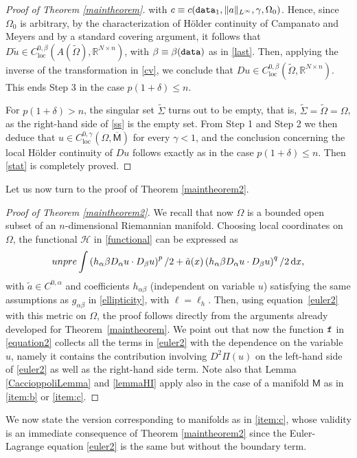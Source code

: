\documentclass[a4paper]{amsart}
\def\loc{\operatorname{loc}}
\theoremstyle{plain}  %
\numberwithin{equation}{section}
\newcommand{\R}{\mathbb{R}}
\newcommand{\dd}{\mathrm{d}}
\newcommand{\mm}{\mathsf{M}}
\newcommand{\nr}[1]{\lVert #1 \rVert}
\newcommand{\tx}[1]{\textnormal{\texttt{#1}}}
\def\loc{\operatorname{loc}}
\def\eqn#1$$#2$${\begin{equation}\label#1#2\end{equation}}
\begin{document}
\begin{proof}[Proof of Theorem \ref{maintheorem}]
with $c \equiv c(\tx{data}_1,\nr{a}_{L^{\infty}},\gamma,\Omega_0)$. Hence, since $\Omega_0$ is arbitrary, by the characterization of H\"older continuity of Campanato and Meyers and by a standard covering argument, it follows that $ D\tilde{u} \in C^{0,\beta}_{\loc}(A(\tilde{\Omega}), \R^{N\times n})$, with $\beta \equiv \beta(\tx{data})$ as in \eqref{last}. Then, applying the inverse of the transformation in \eqref{cv}, we conclude that $Du \in C^{0,\beta}_{\loc}(\tilde{\Omega} ,\R^{N\times n})$. This ends Step 3 in the case $p(1+\delta) \leq n$.

For \(p(1 + \delta) > n\), the singular set $\tilde{\Sigma}$ turns out to be empty, that is, \(\tilde{\Sigma} = \tilde{\Omega} = \Omega\), as the right-hand side of \eqref{ss} is the empty set. From Step 1 and Step 2 we then deduce that \(u \in C^{0,\gamma}_{\loc}(\Omega,\overline{ \mm})\) for every \(\gamma < 1\), and the conclusion concerning the local  H\"older continuity of \(Du\) follows exactly as in the case \(p(1 + \delta) \leq n\). Then \eqref{stat} is completely proved.
\end{proof}
\noindent
Let us now turn to the proof of Theorem \ref{maintheorem2}. 
\begin{proof}[Proof of Theorem \ref{maintheorem2}] We recall that now $\Omega$ is a bounded open subset of an $n$-dimensional Riemannian manifold. Choosing local coordinates on $\Omega$, the functional $\mathcal{H}$ in \eqref{functional} can be expressed as
\eqn{funpre}
$$
\int \left(h_{\alpha \beta} D_\alpha u \cdot D_\beta u\right)^{p/2} + \tilde{a}(x)\left(h_{\alpha \beta} D_\alpha u \cdot D_\beta u\right)^{q/2} \, \dd x,
$$
with $\tilde{a} \in C^{0,\alpha}$ and coefficients $h_{\alpha \beta}$ (independent on variable $u$) satisfying the same assumptions as $g_{\alpha \beta}$ in \eqref{ellipticity}, with $\ell = \ell_h$. Then, using equation~\eqref{euler2} with this metric on $\Omega$, the proof follows directly from the arguments already developed for Theorem~\ref{maintheorem}. We point out that now the function $\tx{f}$ in \eqref{equation2} collects all the
terms in \eqref{euler2} with the dependence on the variable $u$, namely
it contains the contribution involving $D^2\Pi(u)$ on the left-hand side
of \eqref{euler2} as well as the right-hand side term. Note also that Lemma \ref{CaccioppoliLemma} and \ref{lemmaHI} apply also in the case of a manifold $\mm$ as in \ref{item:b} or \ref{item:c}.
\end{proof}
\noindent
We now state the version corresponding to manifolds as in \ref{item:c}, whose validity is an immediate consequence of Theorem \ref{maintheorem2} since the Euler-Lagrange equation \eqref{euler2} is the same but without  the boundary term.
\end{document}
